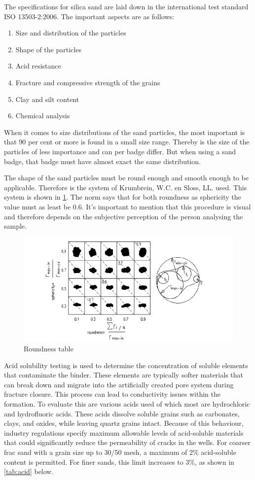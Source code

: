 The specifications for silica sand are laid down in the international test standard ISO 13503-2:2006. The important aspects are as follows:

\begin{enumerate}
    \item  Size and distribution of the particles
    \item Shape of the particles
    \item Acid resistance 
    \item Fracture and compressive strength of the grains
    \item Clay and silt content
    \item Chemical analysis
\end{enumerate}

When it comes to size distributions of the sand particles, the most important is that 90 per cent or more is found in a small size range. Thereby is the size of the particles of less importance and can per badge differ. But when using a sand badge, that badge must have almost exact the same distribution. 

The shape of the sand particles must be round enough and smooth enough to be applicable. Therefore is the system of Krumbrein, W.C. en Sloss, LL. used. This system is shown in \ref{fig:RT}. The norm says that for both roundness as sphericity the value must as least be 0.6. It's important to mention that this procedure is visual and therefore depends on the subjective perception of the person analysing the sample.

\begin{figure}[H]
    \centering
    \includegraphics[width=0.75\linewidth]{figures//ch9/roundness.png}
    \caption{Roundness table \autocite{rodriguezParticleShapeQuantities2013}}
    \label{fig:RT}
\end{figure}

Acid solubility testing is used to determine the concentration of soluble elements that contaminate the binder. These elements are typically softer materials that can break down and migrate into the artificially created pore system during fracture closure. This process can lead to conductivity issues within the formation.
To evaluate this are various acids  used of which most are hydrochloric and hydrofluoric acids. These acids dissolve soluble grains such as carbonates, clays, and oxides, while leaving quartz grains intact. Because of this behaviour, industry regulations specify maximum allowable levels of acid-soluble materials that could significantly reduce the permeability of cracks in the wells.
For coarser frac sand with a grain size up to 30/50 mesh, a maximum of 2\% acid-soluble content is permitted. For finer sands, this limit increases to 3\%, as shown in \ref{tab:acid} below.

